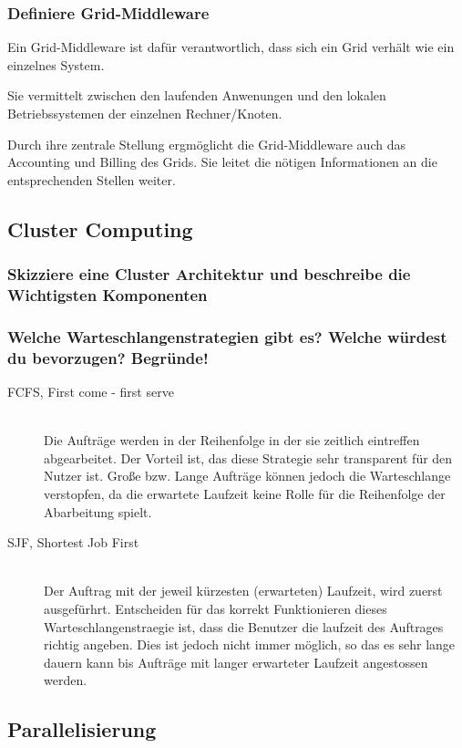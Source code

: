 \subsubsection{Definiere Grid-Middleware}
	Ein Grid-Middleware ist daf\"ur verantwortlich,
	dass sich ein Grid verh\"alt wie ein einzelnes System.
	
	Sie vermittelt zwischen den laufenden Anwenungen und den lokalen
	Betriebssystemen der einzelnen Rechner/Knoten.

	Durch ihre zentrale Stellung ergm\"oglicht die Grid-Middleware auch
	das Accounting und Billing des Grids.
	Sie leitet die nötigen Informationen an die entsprechenden Stellen weiter.

\subsection{Cluster Computing}
	\subsubsection{Skizziere eine Cluster Architektur und beschreibe die
	Wichtigsten Komponenten}
	\subsubsection{Welche Warteschlangenstrategien gibt es? Welche w\"urdest du
	bevorzugen? Begr\"unde!}
	\begin{description}
		\item[FCFS, First come - first serve] \hfill \\
			Die Auftr\"age werden in der Reihenfolge in der sie zeitlich eintreffen abgearbeitet.
			Der Vorteil ist, das diese Strategie sehr transparent f\"ur den Nutzer ist.
			Große bzw. Lange Auftr\"age können jedoch die Warteschlange verstopfen,
			da die erwartete Laufzeit keine Rolle f\"ur die Reihenfolge der Abarbeitung spielt.
		\item[SJF, Shortest Job First] \hfill \\
			Der Auftrag mit der jeweil k\"urzesten (erwarteten) Laufzeit, wird zuerst ausgef\"urhrt.
			Entscheiden f\"ur das korrekt Funktionieren dieses Warteschlangenstraegie ist,
			dass die Benutzer die laufzeit des Auftrages richtig angeben.
			Dies ist jedoch nicht immer möglich,
			so das es sehr lange dauern kann bis Auftr\"age mit langer erwarteter Laufzeit angestossen werden.
	\end{description}
\subsection{Parallelisierung}
